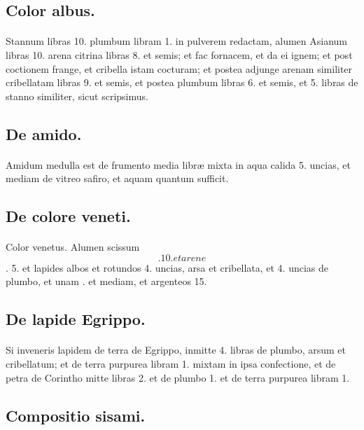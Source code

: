 \documentclass[a4paper, 11pt, oneside, polutonikogreek, italian]{article}
\newcommand*\svgaaa{}
\begin{document}
\subsection{Color albus.}
\paragraph{}
Stannum libras 10. plumbum libram 1. in pulverem redactam, alumen Asianum libras 10. arena citrina libras 8. et semis; et fac fornacem, et da ei ignem; et post coctionem frange, et cribella istam cocturam; et postea adjunge arenam similiter cribellatam libras 9. et semis, et postea plumbum libras 6. et semis, et 5. libras de stanno similiter, sicut scripsimus.

\subsection{De amido.}
\paragraph{}
Amidum medulla est de frumento media libræ mixta in aqua calida 5. uncias, et mediam de vitreo safiro, et aquam quantum sufficit.

\subsection{De colore veneti.}
\paragraph{}
Color venetus. Alumen scissum $\svgaaa$. 10. et arene $\svgaaa$. 5. et lapides albos et rotundos 4. uncias, arsa et cribellata, et 4. uncias de plumbo, et unam $\svgaaa$. et mediam, et argenteos 15.

\subsection{De lapide Egrippo.}
\paragraph{}
Si inveneris lapidem de terra de Egrippo, inmitte 4. libras de plumbo, arsum et cribellatum; et de terra purpurea libram 1. mixtam in ipsa confectione, et de petra de Corintho mitte libras 2. et de plumbo 1. et de terra purpurea libram 1.

\subsection{Compositio sisami.}
\end{document}
